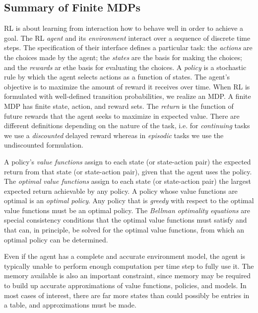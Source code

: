 \documentclass[12pt]{article}
\begin{document}
\subsection{Summary of Finite MDPs}
 RL is about learning from interaction how to behave well in order to achieve a goal. The RL \emph{agent} and its \emph{environment} interact over a sequence of discrete time steps. The specification of their interface defines a particular task: the \emph{actions} are the choices made by the agent; the \emph{states} are the basis for making the choices; and the \emph{rewards} ar ethe basis for evaluating the choices. A \emph{policy} is a stochastic rule by which the agent selects actions as a function of states. The agent's objective is to maximize the amount of reward it receives over time. When RL is formulated with well-defined transition probabilities, we realize an MDP. A finite MDP has finite state, action, and reward sets. The \emph{return} is the function of future rewards that the agent seeks to maximize in expected value. There are different definitions depending on the nature of the task, i.e. for \emph{continuing} tasks we use a \emph{discounted} delayed reward whereas in \emph{episodic} tasks we use the undiscounted formulation.

A policy's \emph{value functions} assign to each state (or state-action pair) the expected return from that state (or state-action pair), given that the agent uses the policy. The \emph{optimal value functions} assign to each state (or state-action pair) the largest expected return achievable by any policy. A policy whose value functions are optimal is an \emph{optimal policy}. Any policy that is \emph{greedy} with respect to the optimal value functions must be an optimal policy. The \emph{Bellman optimality equations} are special consistency conditions that the optimal value functions must satisfy and that can, in principle, be solved for the optimal value functions, from which an optimal policy can be determined.

Even if the agent has a complete and accurate environment model, the agent is typically unable to perform enough computation per time step to fully use it. The memory available is also an important constraint, since memory may be required to build up accurate approximations of value functions, policies, and models. In most cases of interest, there are far more states than could possibly be entries in a table, and approximations must be made. 
\end{document}
